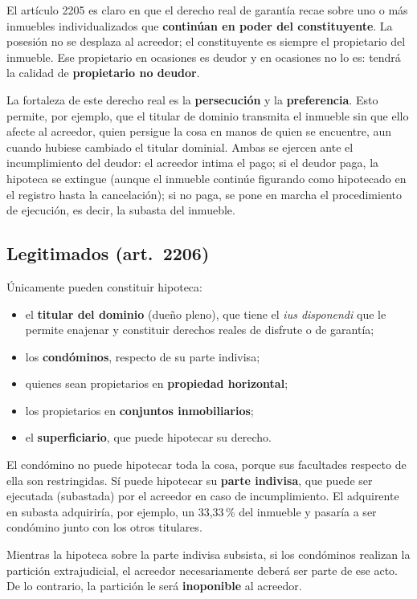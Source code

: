 \documentclass[12pt,oneside]{book}
\begin{document}
El artículo 2205 es claro en que el derecho real de garantía recae sobre uno o más inmuebles individualizados que \textbf{continúan en poder del constituyente}. La posesión no se desplaza al acreedor; el constituyente es siempre el propietario del inmueble. Ese propietario en ocasiones es deudor y en ocasiones no lo es: tendrá la calidad de \textbf{propietario no deudor}.

La fortaleza de este derecho real es la \textbf{persecución} y la \textbf{preferencia}. Esto permite, por ejemplo, que el titular de dominio transmita el inmueble sin que ello afecte al acreedor, quien persigue la cosa en manos de quien se encuentre, aun cuando hubiese cambiado el titular dominial. Ambas se ejercen ante el incumplimiento del deudor: el acreedor intima el pago; si el deudor paga, la hipoteca se extingue (aunque el inmueble continúe figurando como hipotecado en el registro hasta la cancelación); si no paga, se pone en marcha el procedimiento de ejecución, es decir, la subasta del inmueble.

\subsection{Legitimados (art.~2206)}

Únicamente pueden constituir hipoteca:
\begin{itemize}
    \item el \textbf{titular del dominio} (dueño pleno), que tiene el \textit{ius disponendi} que le permite enajenar y constituir derechos reales de disfrute o de garantía;
    \item los \textbf{condóminos}, respecto de su parte indivisa;
    \item quienes sean propietarios en \textbf{propiedad horizontal};
    \item los propietarios en \textbf{conjuntos inmobiliarios};
    \item el \textbf{superficiario}, que puede hipotecar su derecho.
\end{itemize}

El condómino no puede hipotecar toda la cosa, porque sus facultades respecto de ella son restringidas. Sí puede hipotecar su \textbf{parte indivisa}, que puede ser ejecutada (subastada) por el acreedor en caso de incumplimiento. El adquirente en subasta adquiriría, por ejemplo, un 33,33\,\% del inmueble y pasaría a ser condómino junto con los otros titulares.

\begin{importante}
Mientras la hipoteca sobre la parte indivisa subsista, si los condóminos realizan la partición extrajudicial, el acreedor necesariamente deberá ser parte de ese acto. De lo contrario, la partición le será \textbf{inoponible} al acreedor.
\end{importante}
\end{document}
